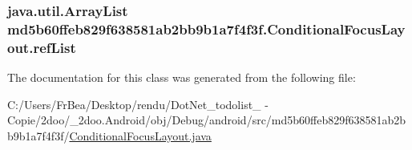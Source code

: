 \hypertarget{classmd5b60ffeb829f638581ab2bb9b1a7f4f3f_1_1_conditional_focus_layout_93bb5d893a06572803a3b5c221292fdc}{
\subsubsection[{refList}]{\setlength{\rightskip}{0pt plus 5cm}java.util.ArrayList {\bf md5b60ffeb829f638581ab2bb9b1a7f4f3f.ConditionalFocusLayout.refList}}}
\label{classmd5b60ffeb829f638581ab2bb9b1a7f4f3f_1_1_conditional_focus_layout_93bb5d893a06572803a3b5c221292fdc}




The documentation for this class was generated from the following file:\begin{CompactItemize}
\item 
C:/Users/FrBea/Desktop/rendu/DotNet\_\-todolist\_ - Copie/2doo/\_\-2doo.Android/obj/Debug/android/src/md5b60ffeb829f638581ab2bb9b1a7f4f3f/\hyperlink{_conditional_focus_layout_8java}{ConditionalFocusLayout.java}\end{CompactItemize}
